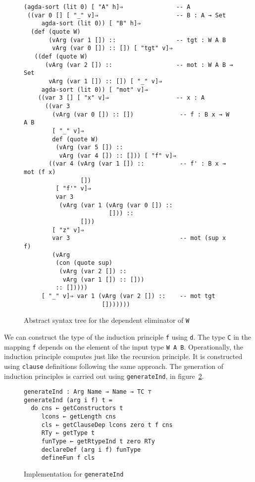 \documentclass[sigplan,10pt]{acmart}
\begin{document}
\begin{figure}
\begin{center}
\begingroup
\fontsize{7pt}{9pt}\selectfont
\begin{Verbatim}
(agda-sort (lit 0) [ "A" h]⇒               -- A
 ((var 0 [] [ "_" v]⇒                      -- B : A → Set
     agda-sort (lit 0)) [ "B" h]⇒
  (def (quote W)
       (vArg (var 1 []) ::                 -- tgt : W A B
        vArg (var 0 []) :: []) [ "tgt" v]⇒
   ((def (quote W)
      (vArg (var 2 []) ::                  -- mot : W A B → Set
       vArg (var 1 []) :: []) [ "_" v]⇒
     agda-sort (lit 0)) [ "mot" v]⇒
    ((var 3 [] [ "x" v]⇒                   -- x : A
      ((var 3
        (vArg (var 0 []) :: [])             -- f : B x → W A B
        [ "_" v]⇒
        def (quote W)
         (vArg (var 5 []) :: 
          vArg (var 4 []) :: [])) [ "f" v]⇒
       ((var 4 (vArg (var 1 []) ::          -- f' : B x → mot (f x)
                [])
         [ "f'" v]⇒
         var 3
          (vArg (var 1 (vArg (var 0 []) ::
                        [])) ::
                []))
        [ "z" v]⇒
        var 3                               -- mot (sup x f)
        (vArg
         (con (quote sup)
          (vArg (var 2 []) :: 
           vArg (var 1 []) :: []))
         :: []))))
     [ "_" v]⇒ var 1 (vArg (var 2 []) ::    -- mot tgt
                      []))))))
\end{Verbatim}
\endgroup
\end{center}
\caption{Abstract syntax tree for the dependent eliminator of {\tt W}}
\label{fig:ast-d'}
\end{figure}
\normalsize

We can construct the type of the induction principle {\tt f} using {\tt d}. The type {\tt C} in the mapping {\tt f} depends on the element of the input type {\tt W A B}.
Operationally, the induction principle computes just like the recursion principle.
It is constructed using {\tt clause} definitions following the same approach.
The generation of induction principles is carried out using {\tt generateInd}, in figure~\ref{fig:generateInd}.


\begin{figure}
\begin{center}
\begin{Verbatim}
generateInd : Arg Name → Name → TC ⊤
generateInd (arg i f) t =
  do cns ← getConstructors t
     lcons ← getLength cns
     cls ← getClauseDep lcons zero t f cns
     RTy ← getType t
     funType ← getRtypeInd t zero RTy
     declareDef (arg i f) funType
     defineFun f cls
\end{Verbatim}
\end{center}
\caption{Implementation for {\tt generateInd}}
\label{fig:generateInd}
\end{figure}
\normalsize
\end{document}
